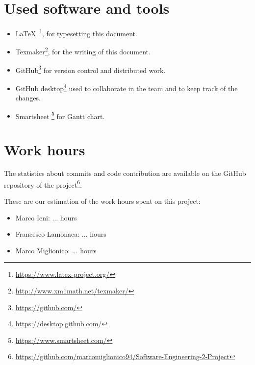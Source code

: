 \section{Used software and tools}
\begin{itemize}
    \item \LaTeX\ \footnote{\url{https://www.latex-project.org/}}, for typesetting this document.
    \item Texmaker\footnote{\url{http://www.xm1math.net/texmaker/}}, for the writing of this document.
    \item GitHub\footnote{\url{https://github.com/}} for version control and distributed work.
   \item GitHub desktop\footnote{\url{https://desktop.github.com/}} used to collaborate in the team and to keep track of the changes. 
    \item Smartsheet \footnote{\url{https://www.smartsheet.com/}} for Gantt chart. 
\end{itemize}

\section{Work hours}
The statistics about commits and code contribution are available on the GitHub repository of the project\footnote{\url{https://github.com/marcomiglionico94/Software-Engineering-2-Project}}.

These are our estimation of the work hours spent on this project:
\begin{itemize}
    \item Marco Ieni: ... hours
    \item Francesco Lamonaca: ... hours
    \item Marco Miglionico: ... hours
\end{itemize}
